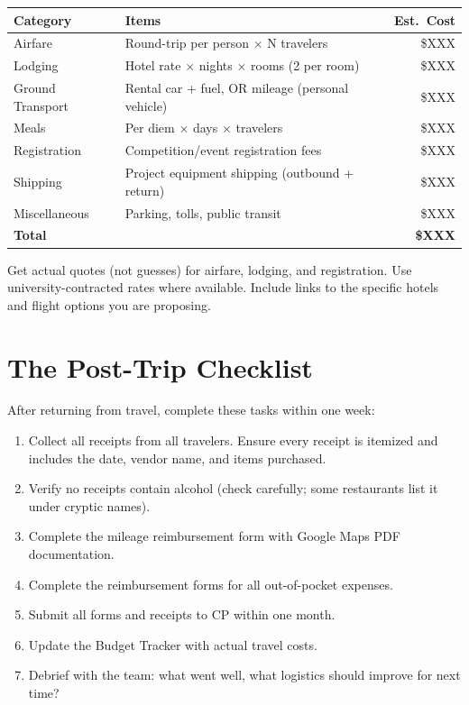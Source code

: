 \begin{center}\small
\begin{tabularx}{\textwidth}{lXr}
\toprule
\textbf{Category} & \textbf{Items} & \textbf{Est.\ Cost} \\
\midrule
Airfare & Round-trip per person $\times$ N travelers & \$XXX \\
Lodging & Hotel rate $\times$ nights $\times$ rooms (2 per room) & \$XXX \\
Ground Transport & Rental car + fuel, OR mileage (personal vehicle) & \$XXX \\
Meals & Per diem $\times$ days $\times$ travelers & \$XXX \\
Registration & Competition/event registration fees & \$XXX \\
Shipping & Project equipment shipping (outbound + return) & \$XXX \\
Miscellaneous & Parking, tolls, public transit & \$XXX \\
\midrule
\textbf{Total} & & \textbf{\$XXX} \\
\bottomrule
\end{tabularx}
\end{center}

Get actual quotes (not guesses) for airfare, lodging, and registration. Use university-contracted rates where available. Include links to the specific hotels and flight options you are proposing.

\section{The Post-Trip Checklist}
After returning from travel, complete these tasks within one week:

\begin{enumerate}[nosep,leftmargin=1.5em]
\item Collect all receipts from all travelers. Ensure every receipt is itemized and includes the date, vendor name, and items purchased.
\item Verify no receipts contain alcohol (check carefully; some restaurants list it under cryptic names).
\item Complete the mileage reimbursement form with Google Maps PDF documentation.
\item Complete the reimbursement forms for all out-of-pocket expenses.
\item Submit all forms and receipts to CP within one month.
\item Update the Budget Tracker with actual travel costs.
\item Debrief with the team: what went well, what logistics should improve for next time?
\end{enumerate}

